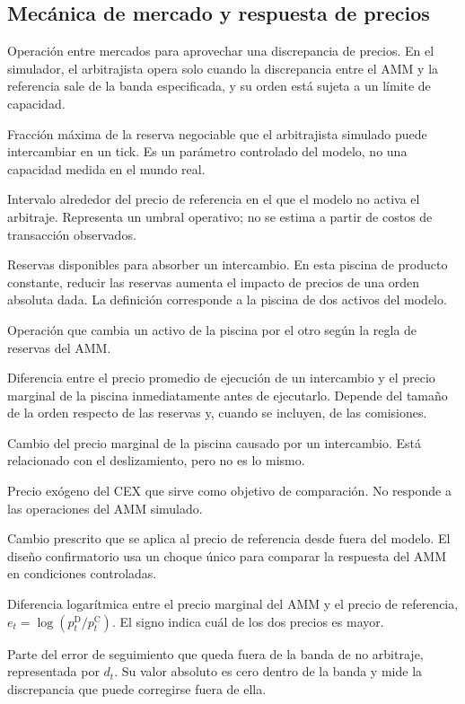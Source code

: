 \subsection*{Mecánica de mercado y respuesta de precios}
\begin{description}[style=unboxed,leftmargin=0pt,labelwidth=0pt,labelsep=0.5em,itemsep=0.1em]
  \item[Arbitraje:] Operación entre mercados para aprovechar una discrepancia de precios. En el simulador, el arbitrajista opera solo cuando la discrepancia entre el AMM y la referencia sale de la banda especificada, y su orden está sujeta a un límite de capacidad.
  \item[Capacidad de arbitraje:] Fracción máxima de la reserva negociable que el arbitrajista simulado puede intercambiar en un tick. Es un parámetro controlado del modelo, no una capacidad medida en el mundo real.
  \item[Banda de no arbitraje:] Intervalo alrededor del precio de referencia en el que el modelo no activa el arbitraje. Representa un umbral operativo; no se estima a partir de costos de transacción observados.
  \item[Liquidez y profundidad:] Reservas disponibles para absorber un intercambio. En esta piscina de producto constante, reducir las reservas aumenta el impacto de precios de una orden absoluta dada. La definición corresponde a la piscina de dos activos del modelo.
  \item[Intercambio (swap):] Operación que cambia un activo de la piscina por el otro según la regla de reservas del AMM.
  \item[Deslizamiento:] Diferencia entre el precio promedio de ejecución de un intercambio y el precio marginal de la piscina inmediatamente antes de ejecutarlo. Depende del tamaño de la orden respecto de las reservas y, cuando se incluyen, de las comisiones.
  \item[Impacto de precios:] Cambio del precio marginal de la piscina causado por un intercambio. Está relacionado con el deslizamiento, pero no es lo mismo.
  \item[Precio de referencia:] Precio exógeno del CEX que sirve como objetivo de comparación. No responde a las operaciones del AMM simulado.
  \item[Choque exógeno:] Cambio prescrito que se aplica al precio de referencia desde fuera del modelo. El diseño confirmatorio usa un choque único para comparar la respuesta del AMM en condiciones controladas.
  \item[Error de seguimiento:] Diferencia logarítmica entre el precio marginal del AMM y el precio de referencia, $e_t=\log(p^{\mathrm D}_t/p^{\mathrm C}_t)$. El signo indica cuál de los dos precios es mayor.
  \item[Exceso de error:] Parte del error de seguimiento que queda fuera de la banda de no arbitraje, representada por $d_t$. Su valor absoluto es cero dentro de la banda y mide la discrepancia que puede corregirse fuera de ella.
\end{description}

